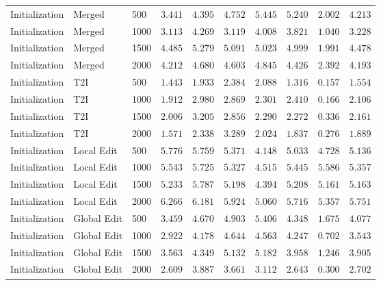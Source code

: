 \documentclass{llmxive}
\begin{document}
\begin{table}[!htbp]
{\begin{tabular}{lll|ccccccc}
    \midrule
    Initialization & Merged & 500 & $3.441$ & $4.395$ & $4.752$ & $5.445$ & $5.240$ & $2.002$ & $4.213$\\
    Initialization & Merged & 1000 & $3.113$ & $4.269$ & $3.119$ & $4.008$ & $3.821$ & $1.040$ & $3.228$\\
    Initialization & Merged & 1500 & $4.485$ & $5.279$ & $5.091$ & $5.023$ & $4.999$ & $1.991$ & $4.478$\\
    Initialization & Merged & 2000 & $4.212$ & $4.680$ & $4.603$ & $4.845$ & $4.426$ & $2.392$ & $4.193$\\
    Initialization & T2I & 500 & $1.443$ & $1.933$ & $2.384$ & $2.088$ & $1.316$ & $0.157$ & $1.554$\\
    Initialization & T2I & 1000 & $1.912$ & $2.980$ & $2.869$ & $2.301$ & $2.410$ & $0.166$ & $2.106$\\
    Initialization & T2I & 1500 & $2.006$ & $3.205$ & $2.856$ & $2.290$ & $2.272$ & $0.336$ & $2.161$\\
    Initialization & T2I & 2000 & $1.571$ & $2.338$ & $3.289$ & $2.024$ & $1.837$ & $0.276$ & $1.889$\\
    Initialization & Local Edit & 500 & $5.776$ & $5.759$ & $5.371$ & $4.148$ & $5.033$ & $4.728$ & $5.136$\\
    Initialization & Local Edit & 1000 & $5.543$ & $5.725$ & $5.327$ & $4.515$ & $5.445$ & $5.586$ & $5.357$\\
    Initialization & Local Edit & 1500 & $5.233$ & $5.787$ & $5.198$ & $4.394$ & $5.208$ & $5.161$ & $5.163$\\
    Initialization & Local Edit & 2000 & $6.266$ & $6.181$ & $5.924$ & $5.060$ & $5.716$ & $5.357$ & $5.751$\\
    Initialization & Global Edit & 500 & $3.459$ & $4.670$ & $4.903$ & $5.406$ & $4.348$ & $1.675$ & $4.077$\\
    Initialization & Global Edit & 1000 & $2.922$ & $4.178$ & $4.644$ & $4.563$ & $4.247$ & $0.702$ & $3.543$\\
    Initialization & Global Edit & 1500 & $3.563$ & $4.349$ & $5.132$ & $5.182$ & $3.958$ & $1.246$ & $3.905$\\
    Initialization & Global Edit & 2000 & $2.609$ & $3.887$ & $3.661$ & $3.112$ & $2.643$ & $0.300$ & $2.702$\\
    \bottomrule
  \end{tabular}%
  }


\end{table}
\end{document}

